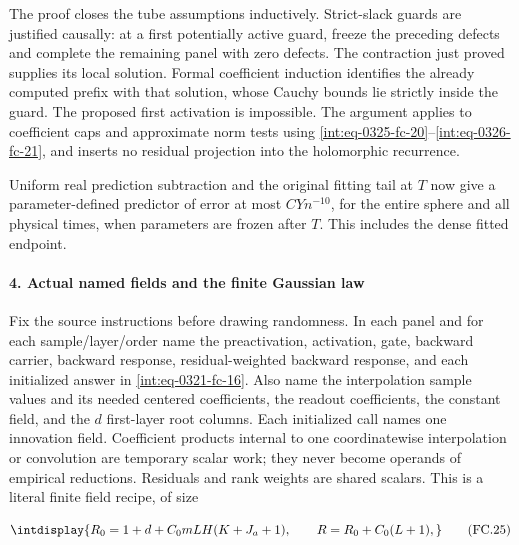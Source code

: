 
The proof closes the tube assumptions inductively. Strict-slack guards are justified causally: at a first potentially active guard, freeze the preceding defects and complete the remaining panel with zero defects. The contraction just proved supplies its local solution. Formal coefficient induction identifies the already computed prefix with that solution, whose Cauchy bounds lie strictly inside the guard. The proposed first activation is impossible. The argument applies to coefficient caps and approximate norm tests using \eqref{int:eq-0325-fc-20}--\allowbreak \eqref{int:eq-0326-fc-21}, and inserts no residual projection into the holomorphic recurrence.



Uniform real prediction subtraction and the original fitting tail at \(T\) now give a parameter-defined predictor of error at most \(CYn^{-10}\), for the entire sphere and all physical times, when parameters are frozen after \(T\). This includes the dense fitted endpoint.


\paragraph{4. Actual named fields and the finite Gaussian law}
\label{int:decoder-gaussian-law}

\mbox{}\par\smallskip


Fix the source instructions before drawing randomness. In each panel and for each sample/layer/order name the preactivation, activation, gate, backward carrier, backward response, residual-weighted backward response, and each initialized answer in \eqref{int:eq-0321-fc-16}. Also name the interpolation sample values and its needed centered coefficients, the readout coefficients, the constant field, and the \(d\) first-layer root columns. Each initialized call names one innovation field. Coefficient products internal to one coordinatewise interpolation or convolution are temporary scalar work; they never become operands of empirical reductions. Residuals and rank weights are shared scalars. This is a literal finite field recipe, of size


\begingroup\renewcommand{\theHequation}{intdisplay.724}
\begin{equation}
\intdisplay{
R_0=1+d+C_0mLH(K+J_a+1),\qquad R=R_0+C_0(L+1),
}
\tag{FC.25}
\label{int:eq-0330-fc-25}
\end{equation}
\endgroup

